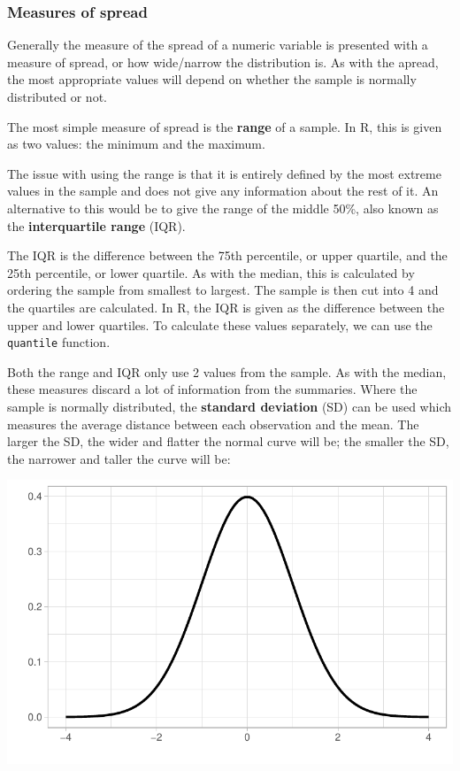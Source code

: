 \documentclass[
  letterpaper,
  DIV=11,
  numbers=noendperiod]{scrreprt}
\begin{document}
\subsubsection{Measures of spread}\label{measures-of-spread}

Generally the measure of the spread of a numeric variable is presented
with a measure of spread, or how wide/narrow the distribution is. As
with the apread, the most appropriate values will depend on whether the
sample is normally distributed or not.

The most simple measure of spread is the \textbf{range} of a sample. In
R, this is given as two values: the minimum and the maximum.

The issue with using the range is that it is entirely defined by the
most extreme values in the sample and does not give any information
about the rest of it. An alternative to this would be to give the range
of the middle 50\%, also known as the \textbf{interquartile range}
(IQR).

The IQR is the difference between the 75th percentile, or upper
quartile, and the 25th percentile, or lower quartile. As with the
median, this is calculated by ordering the sample from smallest to
largest. The sample is then cut into 4 and the quartiles are calculated.
In R, the IQR is given as the difference between the upper and lower
quartiles. To calculate these values separately, we can use the
\texttt{quantile} function.

Both the range and IQR only use 2 values from the sample. As with the
median, these measures discard a lot of information from the summaries.
Where the sample is normally distributed, the \textbf{standard
deviation} (SD) can be used which measures the average distance between
each observation and the mean. The larger the SD, the wider and flatter
the normal curve will be; the smaller the SD, the narrower and taller
the curve will be:

\includegraphics{combining_summarising_files/figure-pdf/normal distribution different sd-1.pdf}
\end{document}
